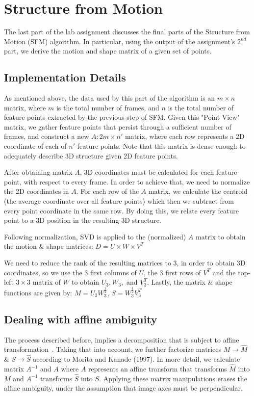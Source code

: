 \section{Structure from Motion}
\label{sfm}

The last part of the lab assignment discusses the final parts of the Structure from Motion (SFM) algorithm. In particular, using the output of the assignment's $2^{nd}$ part, we derive the motion and shape matrix of a given set of points.  

\subsection{Implementation Details}
As mentioned above, the data used by this part of the algorithm is an $m\times n$ matrix, where $m$ is the total number of frames, and $n$ is the total number of feature points extracted by the previous step of SFM. 
Given this "Point View" matrix, we gather feature points that persist through a sufficient number of frames, and construct a new $A: 2m\times n'$ matrix, where each row represents a 2D coordinate of each of $n'$ feature points. Note that this matrix is dense enough to adequately describe 3D structure given 2D feature points.

After obtaining matrix $A$, 3D coordinates must be calculated for each feature point, with respect to every frame. In order to achieve that, we need to normalize the 2D coordinates in $A$. For each row of the $A$ matrix, we calculate the centroid (the average coordinate over all feature points) which then we subtract from every point coordinate in the same row. By doing this, we relate every feature point to a 3D position in the resulting 3D structure.

Following normalization, SVD is applied to the (normalized) $A$ matrix to obtain the motion \& shape matrices:  
$D = U\times W\times V^T$

We need to reduce the rank of the resulting matrices to 3, in order to obtain 3D coordinates, so we use the 3 first columns of $U$, the 3 first rows of $V^T$ and the top-left $3\times 3$ matrix of $W$ to obtain $U_3, W_3,$ and $V^T_3$. Lastly, the matrix \& shape functions are given by: $M = U_3W^{\frac{1}{2}}_3$, $S = W_3^{\frac{1}{2}}V^T_3$

\subsection{Dealing with affine ambiguity}
The process described before, implies a decomposition that is subject to affine transformation~\cite{amb}. Taking that into account, we further factorize matrices $M\rightarrow \hat{M}$ \& $S\rightarrow \hat{S}$ according to Morita and Kanade (1997)\cite{amb}. In more detail, we calculate matrix $A^{-1}$ and $A$ where $A$ represents an affine transform that transforms $\hat{M}$ into $M$ and $A^{-1}$ transforms $\hat{S}$ into $S$. Applying these matrix manipulations erases the affine ambiguity, under the assumption that image axes must be perpendicular\cite{amb}.

